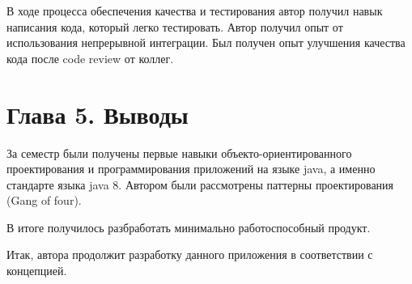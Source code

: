 В ходе процесса обеспечения качества и тестирования автор получил навык написания кода, который легко тестировать. Автор получил опыт от использования непрерывной интеграции. Был получен опыт улучшения качества кода после code review от коллег.

\section*{Глава 5. Выводы}

За семестр были получены первые навыки объекто-ориентированного проектирования и программирования приложений на языке java, а именно стандарте языка java 8. Автором были рассмотрены паттерны проектирования (Gang of four). 

В итоге получилось разбработать минимально работоспособный продукт.

Итак, автора продолжит разработку данного приложения в соответствии с концепцией.



